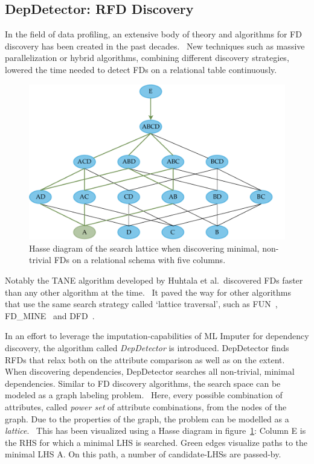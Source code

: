 \subsection{DepDetector: RFD Discovery}
In the field of data profiling, an extensive body of theory and algorithms for FD discovery has been created in the past decades.~\cite[p.~39]{ABE19}
New techniques such as massive parallelization or hybrid algorithms, combining different discovery strategies, lowered the time needed to detect FDs on a relational table continuously.~\cite[p.~40]{ABE19}

\begin{figure}[ht]
     \centering
     \includegraphics[width=\textwidth]{images/search-lattice-fd.pdf}
     \caption{Hasse diagram of the search lattice when discovering minimal, non-trivial FDs on a relational schema with five columns.}
     \label{fig:dep-detector-search-tree}
 \end{figure}

Notably the \textsc{TANE} algorithm developed by Huhtala et al.\ discovered FDs faster than any other algorithm at the time.~\cite{HUH99}
It paved the way for other algorithms that use the same search strategy called `lattice traversal', such as \textsc{FUN}~\cite{NOV08}, \textsc{FD\_MINE}~\cite{YAO02} and \textsc{DFD}~\cite{ABE14}.~\cite[p.~39]{ABE19}

In an effort to leverage the imputation-capabilities of ML Imputer for dependency discovery, the algorithm called \emph{DepDetector} is introduced.
DepDetector finds RFDs that relax both on the attribute comparison as well as on the extent.
When discovering dependencies, DepDetector searches all non-trivial, minimal dependencies.
Similar to FD discovery algorithms, the search space can be modeled as a graph labeling problem.~\cite[p.~24]{ABE19}
Here, every possible combination of attributes, called \emph{power set} of attribute combinations, from the nodes of the graph.
Due to the properties of the graph, the problem can be modelled as a \emph{lattice}.~\cite[p.~24]{ABE19}
This has been visualized using a Hasse diagram in figure~\ref{fig:dep-detector-search-tree}:
Column \textsc{E} is the RHS for which a minimal LHS is searched.
Green edges visualize paths to the minimal LHS \textsc{A}.
On this path, a number of candidate-LHSs are passed-by.

